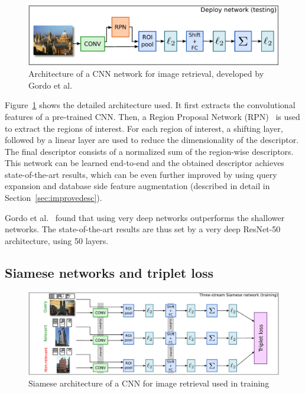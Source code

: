 \begin{figure}
\includegraphics[width=\textwidth]{img/gordo_deepimageretrievaldeploy.png}
\caption{Architecture of a CNN network for image retrieval, developed by
Gordo et al.~\cite{gordo_deep_2016}
\label{fig:gordo_deploy}}
\end{figure}
Figure~\ref{fig:gordo_deploy} shows the detailed architecture used.
It first extracts the convolutional features of a pre-trained
CNN. Then, a Region Proposal Network (RPN)~\cite{ren_faster_2015} is
used to extract the regions of interest. For each region of interest,
a shifting layer, followed by a linear layer are used to reduce the
dimensionality of the descriptor.
The final descriptor consists of a normalized sum of the
region-wise descriptors. This network can be learned end-to-end and
the obtained descriptor achieves state-of-the-art results, which can
be even further improved by using query expansion and database side
feature augmentation (described in detail in Section~\ref{sec:improvedesc}).

Gordo et al.~\cite{gordo_deep_2016} found that using very deep networks
outperforms the shallower networks. The state-of-the-art results are
thus set by a very deep ResNet-50 architecture, using 50 layers.

\subsection{Siamese networks and triplet loss}
\begin{figure}
\includegraphics[width=\textwidth]{img/gordo_deepimageretrievalarc.png}
\caption{Siamese architecture of a CNN for image retrieval used in
training~\cite{gordo_deep_2016}
\label{fig:gordo_train}}
\end{figure}

